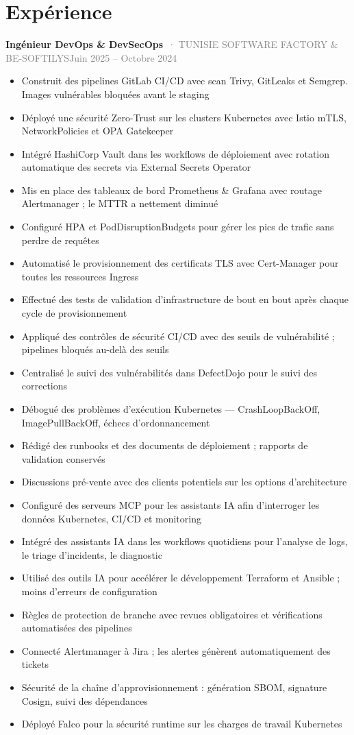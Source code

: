 \documentclass[10pt,a4paper]{article}
\newcommand{\cventry}[3]{\textbf{#1}\ \textcolor{graytext}{· #2}\hfill\textcolor{graytext}{\small #3}\par}
\begin{document}
\section*{Expérience}
\cventry{Ingénieur DevOps \& DevSecOps}{TUNISIE SOFTWARE FACTORY \& BE-SOFTILYS}{Juin 2025 – Octobre 2024}
\begin{itemize}
  \item Construit des pipelines GitLab CI/CD avec scan Trivy, GitLeaks et Semgrep. Images vulnérables bloquées avant le staging
  \item Déployé une sécurité Zero-Trust sur les clusters Kubernetes avec Istio mTLS, NetworkPolicies et OPA Gatekeeper
  \item Intégré HashiCorp Vault dans les workflows de déploiement avec rotation automatique des secrets via External Secrets Operator
  \item Mis en place des tableaux de bord Prometheus \& Grafana avec routage Alertmanager ; le MTTR a nettement diminué
  \item Configuré HPA et PodDisruptionBudgets pour gérer les pics de trafic sans perdre de requêtes
  \item Automatisé le provisionnement des certificats TLS avec Cert-Manager pour toutes les ressources Ingress
  \item Effectué des tests de validation d'infrastructure de bout en bout après chaque cycle de provisionnement
  \item Appliqué des contrôles de sécurité CI/CD avec des seuils de vulnérabilité ; pipelines bloqués au-delà des seuils
  \item Centralisé le suivi des vulnérabilités dans DefectDojo pour le suivi des corrections
  \item Débogué des problèmes d'exécution Kubernetes — CrashLoopBackOff, ImagePullBackOff, échecs d'ordonnancement
  \item Rédigé des runbooks et des documents de déploiement ; rapports de validation conservés
  \item Discussions pré-vente avec des clients potentiels sur les options d'architecture
  \item Configuré des serveurs MCP pour les assistants IA afin d'interroger les données Kubernetes, CI/CD et monitoring
  \item Intégré des assistants IA dans les workflows quotidiens pour l'analyse de logs, le triage d'incidents, le diagnostic
  \item Utilisé des outils IA pour accélérer le développement Terraform et Ansible ; moins d'erreurs de configuration
  \item Règles de protection de branche avec revues obligatoires et vérifications automatisées des pipelines
  \item Connecté Alertmanager à Jira ; les alertes génèrent automatiquement des tickets
  \item Sécurité de la chaîne d'approvisionnement : génération SBOM, signature Cosign, suivi des dépendances
  \item Déployé Falco pour la sécurité runtime sur les charges de travail Kubernetes
\end{itemize}
\end{document}
